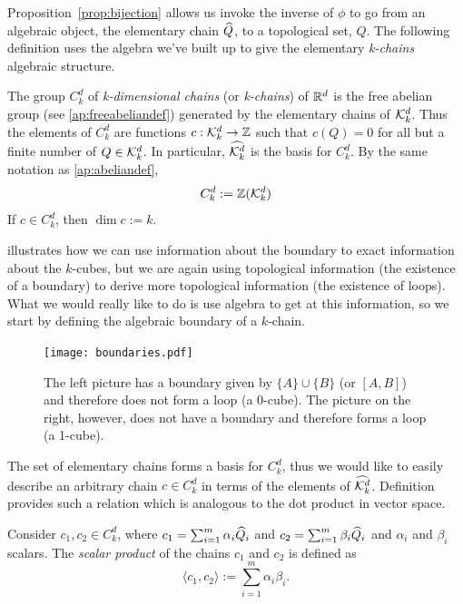 Proposition~\ref{prop:bijection} allows us invoke the inverse of $\phi$ to go from an algebraic object, the elementary chain $\widehat{Q}$, to a topological set, $Q$. The following definition uses the algebra we've built up to give the elementary \textit{k-chains} algebraic structure.
%
\begin{defn}
	The group $C_k^d$ of \textit{k-dimensional chains} (or \textit{k-chains}) of $\mathbb{R}^d$ is the free abelian group (see \ref{ap:freeabeliandef}) generated by the elementary chains of $\mathcal{K}^{d}_k$. Thus the elements of $C_k^d$ are functions $c : \mathcal{K}^{d}_k \rightarrow \mathbb{Z}$ such that $c(Q) = 0$ for all but a finite number of $Q \in \mathcal{K}^{d}_k$. In particular, $\widehat{\mathcal{K}^{d}_k}$ is the basis for $C_k^d$. By the same notation as \ref{ap:abeliandef},
	$$ C_k^d := \mathbb{Z}(\mathcal{K}^{d}_k) $$
	If $ c \in C_k^d$, then $\dim c := k$.
\end{defn}

 illustrates how we can use information about the boundary to exact information about the $k$-cubes, but we are again using topological information (the existence of a boundary) to derive more topological information (the existence of loops). What we would really like to do is use algebra to get at this information, so we start by defining the algebraic boundary of a $k$-chain.
%
\begin{figure}[h]
	\begin{center}
	\texttt{[image: boundaries.pdf]}
	\caption{\label{fig:boundaries} The left picture has a boundary given by $\{ A \} \cup \{ B \}$ (or $[A, B]$) and therefore does not form a loop (a 0-cube). The picture on the right, however, does not have a boundary and therefore forms a loop (a 1-cube).}
	\end{center}
\end{figure}

The set of elementary chains forms a basis for $C_k^d$, thus we would like to easily describe an arbitrary chain $c \in C_k^d$ in terms of the elements of $\widehat{\mathcal{K}^{d}_k}$. Definition  provides such a relation which is analogous to the dot product in vector space.

\begin{defn} \label{defn:chainprod}
	Consider $c_1, c_2 \in C_k^d$, where $c_1 = \sum_{i=1}^m \alpha_i \widehat{Q}_i $ and $ c_2 = \sum_{i=1}^m \beta_i \widehat{Q}_i $ and $\alpha_i$ and $\beta_i$ scalars. The \textit{scalar product} of the chains $c_1$ and $c_2$ is defined as
	$$ \langle c_1, c_2 \rangle := \sum_{i=1}^m \alpha_i \beta_i . $$
\end{defn}

